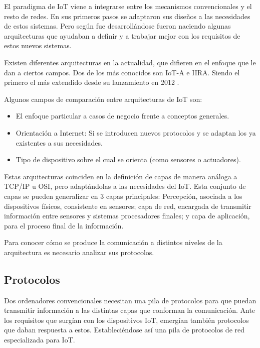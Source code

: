 \documentclass[a4paper,10pt]{article}
\begin{document}
El paradigma de IoT viene a integrarse entre los mecanismos
convencionales y el resto de redes. En sus primeros pasos se adaptaron
sus diseños a las necesidades de estos sistemas. Pero según fue
desarrollándose fueron naciendo algunas arquitecturas que ayudaban a
definir y a trabajar mejor con los requisitos de estos nuevos sistemas.

Existen diferentes arquitecturas en la actualidad, que difieren en el
enfoque que le dan a ciertos campos. Dos de los más conocidos son IoT-A
e IIRA. Siendo el primero el más extendido desde su lanzamiento en 2012
\cite{weyrichReferenceArchitecturesInternet2016}.

Algunos campos de comparación entre arquitecturas de IoT son\cite{atzoriInternetThingsSurvey2010}:

\begin{itemize}
\item
  El enfoque particular a casos de negocio frente a conceptos generales.
\item
  Orientación a Internet: Si se introducen nuevos protocolos y se
  adaptan los ya existentes a sus necesidades.
\item
  Tipo de dispositivo sobre el cual se orienta (como sensores o
  actuadores).
\end{itemize}

Estas arquitecturas coinciden en la definición de capas de manera
análoga a TCP/IP u
OSI\cite{weyrichReferenceArchitecturesInternet2016}, pero adaptándolas
a las necesidades del IoT. Esta conjunto de capas se pueden
generalizar en 3 capas principales: Percepción, asociada a los
dispositivos físicos, consistente en sensores; capa de red, encargada
de transmitir información entre sensores y sistemas procesadores
finales; y capa de aplicación, para el proceso final de la
información\cite{khanFutureInternetInternet2012}.

Para conocer cómo se produce la comunicación a distintos niveles de la
arquitectura es necesario analizar sus protocolos.

\subsection{Protocolos}\label{subsec:protocolos}

Dos ordenadores convencionales necesitan una pila de protocolos para que
puedan transmitir información a las distintas capas que conforman la
comunicación. Ante los requisitos que surgían con los dispositivos IoT,
emergían también protocolos que daban respuesta a estos. Estableciéndose
así una pila de protocolos de red especializada para IoT.
\end{document}
